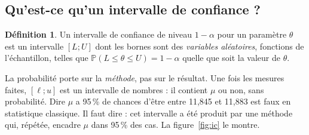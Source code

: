\documentclass[11pt,a4paper]{article}
\theoremstyle{sj}
\theoremstyle{definition}
\newtheorem{defi}{Définition}
\theoremstyle{remark}
\providecommand{\og}{\guillemotleft\nobreakspace}
\providecommand{\fg}{\nobreakspace\guillemotright}
\renewcommand{\P}{\mathbb{P}}
\begin{document}
\subsection{Qu'est-ce qu'un intervalle de confiance ?}

\begin{defi}
Un intervalle de confiance de niveau $1-\alpha$ pour un paramètre $\theta$ est un intervalle $[L;U]$ dont les bornes sont des \emph{variables aléatoires}, fonctions de l'échantillon, telles que $\P(L\le\theta\le U)=1-\alpha$ quelle que soit la valeur de $\theta$.
\end{defi}

La probabilité porte sur la \emph{méthode}, pas sur le résultat. Une fois les mesures faites, $[\ell;u]$ est un intervalle de nombres : il contient $\mu$ ou non, sans probabilité. Dire \og $\mu$ a 95\,\% de chances d'être entre 11,845 et 11,883\fg{} est faux en statistique classique. Il faut dire : \og cet intervalle a été produit par une méthode qui, répétée, encadre $\mu$ dans 95\,\% des cas\fg{}. La figure~\ref{fig:ic} le montre.
\end{document}

